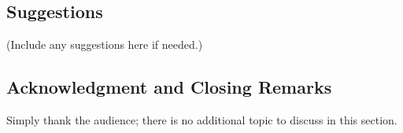 \documentclass[12pt]{article}
\begin{document}
\subsection*{Suggestions}
(Include any suggestions here if needed.)

\subsection*{Acknowledgment and Closing Remarks}
Simply thank the audience; there is no additional topic to discuss in this section.
\end{document}
